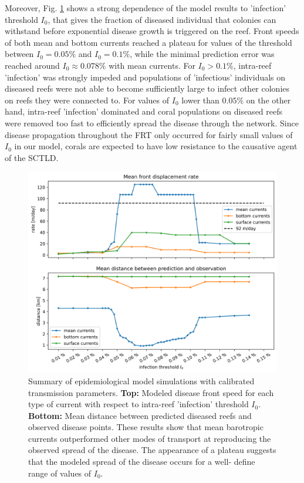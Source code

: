 \documentclass[utf8]{frontiersSCNS}
\begin{document}
Moreover, Fig. \ref{fig:results} shows a strong dependence of the model results to 'infection' threshold $I_0$, that gives the fraction of diseased individual that colonies can withstand before exponential disease growth is triggered on the reef. Front speeds of both mean and bottom currents reached a plateau for values of the threshold between $I_0=0.05\%$ and $I_0=0.1\%$, while the minimal prediction error was reached around $I_0 \approx 0.078\%$ with mean currents. For $I_0 > 0.1\%$, intra-reef 'infection' was strongly impeded and populations of 'infectious' individuals on diseased reefs were not able to become sufficiently large to infect other colonies on reefs they were connected to. For values of $I_0$ lower than $0.05\%$ on the other hand, intra-reef 'infection' dominated and coral populations on diseased reefs were removed too fast to efficiently spread the disease through the network. Since disease propagation throughout the FRT only occurred for fairly small values of $I_0$ in our model, corals are expected to have low resistance to the causative agent of the SCTLD. 

\begin{figure}
    \centering
    \includegraphics[width=.8\textwidth]{figures/sctld_validation_corrected.png}
    \caption{Summary of epidemiological model simulations with calibrated transmission parameters. \textbf{Top:} Modeled disease front speed for each type of current with respect to intra-reef 'infection' threshold $I_0$. \textbf{Bottom:} Mean distance between predicted diseased reefs and observed disease points. These results show that mean barotropic currents outperformed other modes of transport at reproducing the observed spread of the disease. The appearance of a plateau suggests that the modeled spread of the disease occurs for a well- define range of values of $I_0$.}
    \label{fig:results}
\end{figure}
\end{document}

